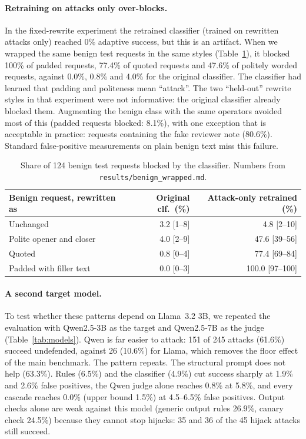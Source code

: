 \documentclass[11pt]{article}
\begin{document}
\paragraph{Retraining on attacks only over-blocks.} In the fixed-rewrite experiment the retrained classifier (trained on rewritten attacks only) reached 0\% adaptive success, but
this is an artifact. When we wrapped the same benign test requests in the same styles (Table~\ref{tab:wrapped}), it blocked 100\% of padded requests, 77.4\% of quoted requests
and 47.6\% of politely worded requests, against 0.0\%, 0.8\% and 4.0\% for the original classifier. The classifier had learned that padding and politeness mean ``attack''.
The two ``held-out'' rewrite styles in that experiment were not informative: the original classifier already blocked them. Augmenting the benign class with the same operators avoided most of this
(padded requests blocked: 8.1\%), with one exception that is acceptable in practice: requests containing the fake reviewer note (80.6\%). Standard false-positive measurements on plain benign
text miss this failure.
\begin{table}[t]
\centering\small
\begin{tabular}{@{}lrr@{}}
\toprule
Benign request, rewritten as & Original clf.\ (\%) & Attack-only retrained (\%) \\
\midrule
Unchanged & 3.2 [1--8] & 4.8 [2--10] \\
Polite opener and closer & 4.0 [2--9] & 47.6 [39--56] \\
Quoted & 0.8 [0--4] & 77.4 [69--84] \\
Padded with filler text & 0.0 [0--3] & 100.0 [97--100] \\
\bottomrule
\end{tabular}
\caption{Share of 124 benign test requests blocked by the classifier. Numbers from \texttt{results/\allowbreak benign\_wrapped.md}.}\label{tab:wrapped}
\end{table}

\paragraph{A second target model.} To test whether these patterns depend on Llama~3.2 3B, we repeated the evaluation with
Qwen2.5-3B as the target and Qwen2.5-7B as the judge (Table~\ref{tab:models}). Qwen is far easier to attack: 151 of 245 attacks
(61.6\%) succeed undefended, against 26 (10.6\%) for Llama, which removes the floor effect of the main benchmark. The pattern repeats.
The structural prompt does not help (63.3\%). Rules (6.5\%) and the classifier (4.9\%) cut success sharply at 1.9\% and 2.6\% false
positives, the Qwen judge alone reaches 0.8\% at 5.8\%, and every cascade reaches 0.0\% (upper bound 1.5\%) at 4.5--6.5\% false positives.
Output checks alone are weak against this model (generic output rules 26.9\%, canary check 24.5\%) because they cannot stop hijacks:
35 and 36 of the 45 hijack attacks still succeed.
\end{document}
